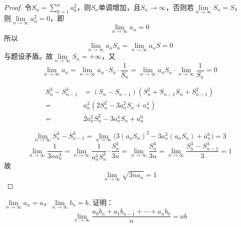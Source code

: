 \begin{proof}

    令$S_n = \sum\limits_{k  = 1}^{n}{a_k^2}$，则$S_n$单调增加，且$S_n \to \infty$，否则若$\lim\limits_{n \to \infty}{S_n} = S$，\\
    则$\lim\limits_{n \to \infty}{a_n^2} = 0$，即
    $$\lim\limits_{n \to \infty}{a_n} = 0$$
    所以
    $$\lim\limits_{n \to \infty}{a_nS_n} = \lim\limits_{n \to \infty}{a_nS} = 0$$
    与题设矛盾。故$\lim\limits_{n \to \infty}{S_n} = +\infty$，又
    $$\lim\limits_{n \to \infty}{a_n} = \lim\limits_{n \to \infty}{a_n \cdot S_n \cdot \dfrac{1}{S_n}} = \lim\limits_{n \to \infty}{a_nS_n} \cdot \lim\limits_{n \to \infty}{\dfrac{1}{S_n}} = 0$$

    \begin{align*}
        S_n^3 - S_{n - 1}^3 & = (S_n - S_{n - 1}) (S_n^2 + S_{n - 1}S_n + S_{n - 1}^2) \\
        = & a_n^2 (2S_n^2 - 3a_n^2S_n + a_n^4) \\
        = & 2a_n^2S_n^2 - 3a_n^4S_n + a_n^6 
    \end{align*}
    
    $$\lim\limits_{n \to \infty}{S_n^3 - S_{n - 1}^3} =  \lim\limits_{n \to \infty}{\big( 3(a_nS_n)^2 - 3a_n^3(a_nS_n) + a_n^6 \big)} = 3$$
    $$\lim\limits_{n \to \infty}{\dfrac{1}{3na_n^3}} = \lim\limits_{n \to \infty}{\dfrac{1}{a_n^3S_n^3} \cdot \dfrac{S_n^3}{3n}} = \lim\limits_{n \to \infty}{\dfrac{S_n^3}{3n}} = \lim\limits_{n \to \infty}{\dfrac{S_n^3 - S_{n - 1}^3}{3}} = 1$$
    故
    $$\lim\limits_{n \to \infty}{\sqrt{3na_n}} = 1$$

\end{proof}

\begin{proposition}

    $\lim\limits_{n \to \infty}{a_n} = a $，$\lim\limits_{n \to \infty}{b_n} = b $. 证明：
    $$\lim\limits_{n \to \infty}{\dfrac{a_0b_n + a_1b_{n - 1} + \cdots + a_nb_0}{n}} = ab$$

\end{proposition}

